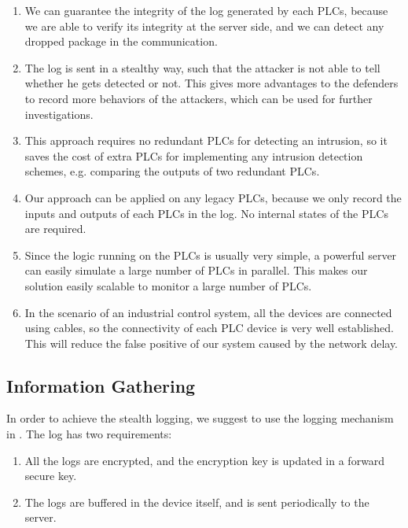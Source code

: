 \begin{enumerate}
\item We can guarantee the integrity of the log generated by each PLCs, because we are able to verify its integrity at the server side, and we can detect any dropped package in the communication.  

\item The log is sent in a stealthy way, such that the attacker is not able to tell whether he gets detected or not. This gives more advantages to the defenders to record more behaviors of the attackers, which can be used for further investigations.  

\item This approach requires no redundant PLCs for detecting an intrusion, so it saves the cost of extra PLCs for implementing any intrusion detection schemes, e.g. comparing the outputs of two redundant PLCs. 

\item Our approach can be applied on any legacy PLCs, because we only record the inputs and outputs of each PLCs in the log. No internal states of the PLCs are required. 

\item Since the logic running on the PLCs is usually very simple, a powerful server can easily simulate a large number of PLCs in parallel. This makes our solution easily scalable to monitor a large number of PLCs.

\item In the scenario of an industrial control system, all the devices are connected using cables, so the connectivity of each PLC device is very well established. This will reduce the false positive of our system caused by the network delay. 

\end{enumerate} 


\subsection{Information Gathering}

In order to achieve the stealth logging, we suggest to use the logging mechanism in \cite{IEEEhowto:kopka}. The log has two requirements:

\begin{enumerate}
\item All the logs are encrypted, and the encryption key is updated in a forward secure key. 
\item The logs are buffered in the device itself, and is sent periodically to the server.
\end{enumerate}

